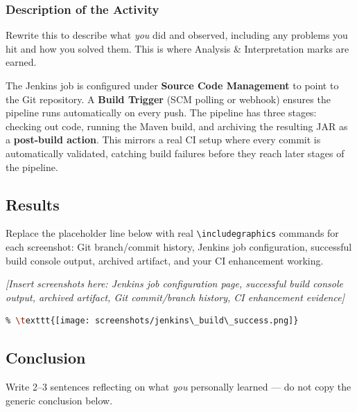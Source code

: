 \documentclass[12pt,a4paper]{article}
\begin{document}
\subsubsection*{Description of the Activity}
\begin{studentnote}
Rewrite this to describe what \textit{you} did and observed, including any problems you hit and how you solved them. This is where Analysis \& Interpretation marks are earned.
\end{studentnote}

The Jenkins job is configured under \textbf{Source Code Management} to point to the Git repository. A \textbf{Build Trigger} (SCM polling or webhook) ensures the pipeline runs automatically on every push. The pipeline has three stages: checking out code, running the Maven build, and archiving the resulting JAR as a \textbf{post-build action}. This mirrors a real CI setup where every commit is automatically validated, catching build failures before they reach later stages of the pipeline.

\subsection*{Results}
\begin{studentnote}
Replace the placeholder line below with real \texttt{\textbackslash includegraphics} commands for each screenshot: Git branch/commit history, Jenkins job configuration, successful build console output, archived artifact, and your CI enhancement working.
\end{studentnote}

\textit{[Insert screenshots here: Jenkins job configuration page, successful build console output, archived artifact, Git commit/branch history, CI enhancement evidence]}

\begin{lstlisting}[language=bash]
% Example of how to insert a real screenshot:
% \texttt{[image: screenshots/jenkins\_build\_success.png]}
\end{lstlisting}

\subsection*{Conclusion}
\begin{studentnote}
Write 2--3 sentences reflecting on what \textit{you} personally learned --- do not copy the generic conclusion below.
\end{studentnote}
\end{document}
